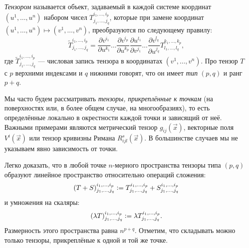 \begin{definition}
	\textit{Тензором} называется объект, задаваемый в каждой системе координат $(u^1, \ldots, u^n)$ набором чисел $T^{i_1, \ldots, i_p}_{j_1, \ldots, j_q}$, которые при замене координат $(u^1, \ldots, u^n) \mapsto (v^1, \ldots, v^n)$, преобразуются по следующему правилу:
	\[
		\widetilde{T}^{i_1, \ldots, i_p}_{j_1, \ldots, j_q} = \frac{\partial v^{i_1}}{\partial u^{k_1}} \ldots \frac{\partial v^{i_p}}{\partial u^{k_p}}\frac{\partial u^{l_1}}{\partial v^{j_1}} \ldots \frac{\partial v^{l_q}}{\partial u^{j_q}}T^{k_1, \ldots, k_p}_{l_1, \ldots, l_q},
	\]
	где $\widetilde{T}^{i_1, \ldots, i_p}_{j_1, \ldots, j_q}$ --- числовая запись тензора в координатах $(v^1, \ldots, v^n)$. Про тензор $T$ с $p$ верхними индексами и $q$ нижними говорят, что он имеет \textit{тип} $(p, q)$ и ранг $p + q$.
\end{definition}

Мы часто будем рассматривать \textit{тензоры, прикреплённые к точкам} (на поверхностях или, в более общем случае, на многообразиях), то есть определённые локально в окрестности каждой точки и зависящий от неё. Важными примерами являются метрический тензор $g_{ij}(\vec{x})$, векторные поля $V^i(\vec{x})$ или тензор кривизны Римана $R^s_{ijl}(\vec{x})$. В большинстве случаев мы не указываем явно зависимость от точки.

Легко доказать, что в любой точке $n$-мерного пространства тензоры типа $(p, q)$ образуют линейное пространство относительно операций сложения:
\[
	(T + S)^{i_1, \ldots, i_p}_{j_1, \ldots, j_q} \vcentcolon = T^{i_1, \ldots, i_p}_{j_1, \ldots, j_q} + S^{i_1, \ldots, i_p}_{j_1, \ldots, j_q}
\]
и умножения на скаляры:
\[
	(\lambda T)^{i_1, \ldots, i_p}_{j_1, \ldots, j_q} \vcentcolon = \lambda T^{i_1, \ldots, i_p}_{j_1, \ldots, j_q}.
\]
Размерность этого пространства равна $n^{p + q}$. Отметим, что складывать можно только тензоры, прикреплёные к одной и той же точке.

